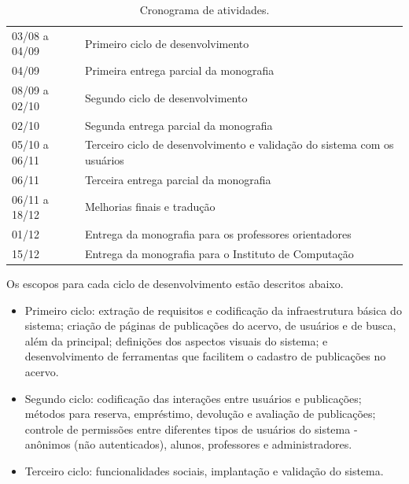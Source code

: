 \documentclass[a4paper]{article}
\begin{document}
\begin{table}[hc]
\centering
\caption{Cronograma de atividades.\label{cronograma}}
\begin{tabular}{ll}
\hline
03/08 a 04/09 & Primeiro ciclo de desenvolvimento \\
04/09 & Primeira entrega parcial da monografia \\
08/09 a 02/10 & Segundo ciclo de desenvolvimento \\
02/10 & Segunda entrega parcial da monografia \\
05/10 a 06/11 & Terceiro ciclo de desenvolvimento e validação do sistema com os usuários \\
06/11 & Terceira entrega parcial da monografia \\
06/11 a 18/12 & Melhorias finais e tradução\\
01/12 & Entrega da monografia para os professores orientadores\\
15/12 & Entrega da monografia para o Instituto de Computação\\
\hline
\end{tabular}
\end{table}

Os escopos para cada ciclo de desenvolvimento estão descritos abaixo.

\begin{itemize}
\item Primeiro ciclo: extração de requisitos e codificação da infraestrutura básica do sistema; criação de páginas de publicações do acervo, de usuários e de busca, além da principal; definições dos aspectos visuais do sistema; e desenvolvimento de ferramentas que facilitem o cadastro de publicações no acervo.
\item Segundo ciclo: codificação das interações entre usuários e publicações; métodos para reserva, empréstimo, devolução e avaliação de publicações; controle de permissões entre diferentes tipos de usuários do sistema - anônimos (não autenticados), alunos, professores e administradores.
\item Terceiro ciclo: funcionalidades sociais, implantação e validação do sistema.
\end{itemize}
\end{document}
